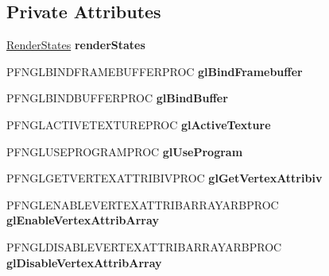 \subsection*{Private Attributes}
\begin{DoxyCompactItemize}
\item 
\hypertarget{class_open_g_l_state_a52e2325cc665c673b59eb43ce611a841}{\hyperlink{struct_render_states}{Render\-States} {\bfseries render\-States}}\label{class_open_g_l_state_a52e2325cc665c673b59eb43ce611a841}

\item 
\hypertarget{class_open_g_l_state_a580ee79f804a92e55b95c4910b2254e5}{P\-F\-N\-G\-L\-B\-I\-N\-D\-F\-R\-A\-M\-E\-B\-U\-F\-F\-E\-R\-P\-R\-O\-C {\bfseries gl\-Bind\-Framebuffer}}\label{class_open_g_l_state_a580ee79f804a92e55b95c4910b2254e5}

\item 
\hypertarget{class_open_g_l_state_a190e392c9aad9ccef7e947b7273c7522}{P\-F\-N\-G\-L\-B\-I\-N\-D\-B\-U\-F\-F\-E\-R\-P\-R\-O\-C {\bfseries gl\-Bind\-Buffer}}\label{class_open_g_l_state_a190e392c9aad9ccef7e947b7273c7522}

\item 
\hypertarget{class_open_g_l_state_a4522af78a19fa306ecae319663411014}{P\-F\-N\-G\-L\-A\-C\-T\-I\-V\-E\-T\-E\-X\-T\-U\-R\-E\-P\-R\-O\-C {\bfseries gl\-Active\-Texture}}\label{class_open_g_l_state_a4522af78a19fa306ecae319663411014}

\item 
\hypertarget{class_open_g_l_state_a9d20b98a10b8deff956ad4a788f2790e}{P\-F\-N\-G\-L\-U\-S\-E\-P\-R\-O\-G\-R\-A\-M\-P\-R\-O\-C {\bfseries gl\-Use\-Program}}\label{class_open_g_l_state_a9d20b98a10b8deff956ad4a788f2790e}

\item 
\hypertarget{class_open_g_l_state_a3a5d55d76a431489f0e038c31e14cfc1}{P\-F\-N\-G\-L\-G\-E\-T\-V\-E\-R\-T\-E\-X\-A\-T\-T\-R\-I\-B\-I\-V\-P\-R\-O\-C {\bfseries gl\-Get\-Vertex\-Attribiv}}\label{class_open_g_l_state_a3a5d55d76a431489f0e038c31e14cfc1}

\item 
\hypertarget{class_open_g_l_state_a2e6123b8a623704b3426908209a74c4e}{P\-F\-N\-G\-L\-E\-N\-A\-B\-L\-E\-V\-E\-R\-T\-E\-X\-A\-T\-T\-R\-I\-B\-A\-R\-R\-A\-Y\-A\-R\-B\-P\-R\-O\-C {\bfseries gl\-Enable\-Vertex\-Attrib\-Array}}\label{class_open_g_l_state_a2e6123b8a623704b3426908209a74c4e}

\item 
\hypertarget{class_open_g_l_state_a20d717b19254cb673b9e711e2629de32}{P\-F\-N\-G\-L\-D\-I\-S\-A\-B\-L\-E\-V\-E\-R\-T\-E\-X\-A\-T\-T\-R\-I\-B\-A\-R\-R\-A\-Y\-A\-R\-B\-P\-R\-O\-C {\bfseries gl\-Disable\-Vertex\-Attrib\-Array}}\label{class_open_g_l_state_a20d717b19254cb673b9e711e2629de32}


\end{DoxyCompactItemize}
